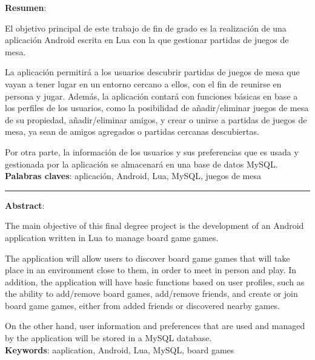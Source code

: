 \textbf{Resumen}:

El objetivo principal de este trabajo de fin de grado es la realización de una aplicación Android escrita en Lua con la que gestionar partidas de juegos de mesa.

La aplicación permitirá a los usuarios descubrir partidas de juegos de mesa que vayan a tener lugar en un entorno cercano a ellos, con el fin de reunirse en persona y jugar. Además, la aplicación contará con funciones básicas en base a los perfiles de los usuarios, como la posibilidad de añadir/eliminar juegos de mesa de su propiedad, añadir/eliminar amigos, y crear o unirse a partidas de juegos de mesa, ya sean de amigos agregados o partidas cercanas descubiertas.

Por otra parte, la información de los usuarios y sus preferencias que es usada y gestionada por la aplicación se almacenará en una base de datos MySQL.
\\

\textbf{Palabras claves}: aplicación, Android, Lua, MySQL, juegos de mesa


\vspace{1cm}

\begin{center}
    \rule{0.5\textwidth}{.4pt}
\end{center}

\vspace{1cm}


\textbf{Abstract}:

The main objective of this final degree project is the development of an Android application written in Lua to manage board game games.

The application will allow users to discover board game games that will take place in an environment close to them, in order to meet in person and play. In addition, the application will have basic functions based on user profiles, such as the ability to add/remove board games, add/remove friends, and create or join board game games, either from added friends or discovered nearby games.

On the other hand, user information and preferences that are used and managed by the application will be stored in a MySQL database.
\\

\textbf{Keywords}: aaplication, Android, Lua, MySQL, board games
